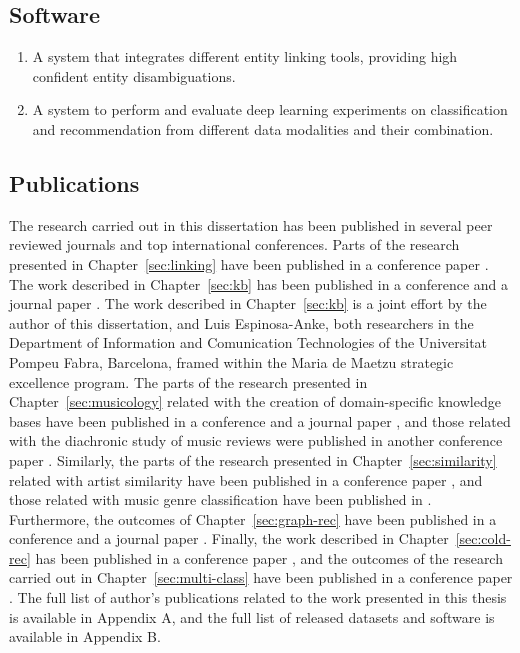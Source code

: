 \subsection{Software}

\begin{enumerate}
\item
A system that integrates different entity linking tools, providing high confident entity disambiguations.

\item
A system to perform and evaluate deep learning experiments on classification and recommendation from different data modalities and their combination. %

\end{enumerate}

\subsection{Publications}
\label{sec:conclusion:publications}

The research carried out in this dissertation has been published in several peer reviewed journals and top international conferences. Parts of the research presented in Chapter~\ref{sec:linking} have been published in a conference paper \citep{Oramas2016}. The work described in Chapter~\ref{sec:kb} has been published in a conference and a journal paper \citep{Oramas2015,Oramas2016a}. The work described in Chapter~\ref{sec:kb} is a joint effort by the author of this dissertation, and Luis Espinosa-Anke, both researchers in the Department of Information and Comunication Technologies of the Universitat Pompeu Fabra, Barcelona, framed within the Maria de Maetzu strategic excellence program. The parts of the research presented in Chapter~\ref{sec:musicology} related with the creation of domain-specific knowledge bases have been published in a conference and a journal paper \citep{Oramas2015b,oramas2016knowledge}, and those related with the diachronic study of music reviews were published in another conference paper \citep{oramas2016exploring}. Similarly, the parts of the research presented in Chapter~\ref{sec:similarity} related with artist similarity have been published in a conference paper \citep{Oramas2015a}, and those related with music genre classification have been published in \cite{oramas2016exploring}. Furthermore, the outcomes of Chapter~\ref{sec:graph-rec} have been published in a conference and a journal paper \citep{Ostuni2015,oramas2016sound}. Finally, the work described in Chapter~\ref{sec:cold-rec} has been published in a conference paper \citep{oramas2017deep}, and the outcomes of the research carried out in Chapter~\ref{sec:multi-class} have been published in a conference paper \citep{oramas2017multi}. The full list of author's publications related to the work presented in this thesis is available in Appendix A, and the full list of released datasets and software is available in Appendix B.


